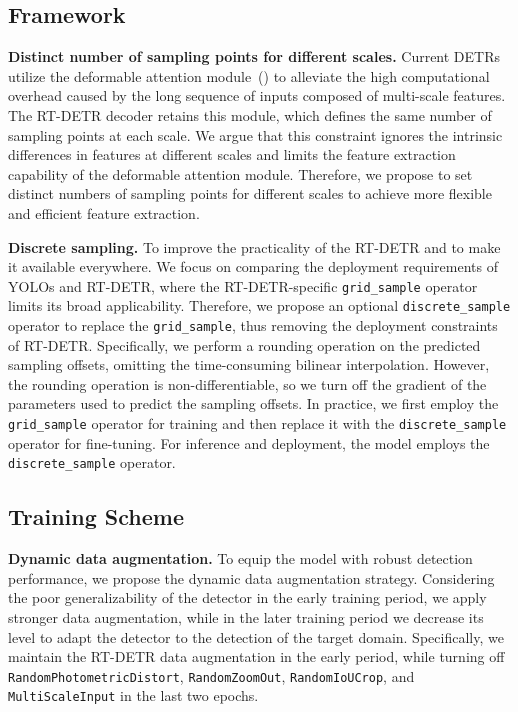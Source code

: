 \documentclass{article}
\begin{document}
\subsection{Framework}
\noindent \textbf{Distinct number of sampling points for different scales.} 
Current DETRs utilize the deformable attention module~(\cite{zhu2020deformable}) to alleviate the high computational overhead caused by the long sequence of inputs composed of multi-scale features.
The RT-DETR decoder retains this module, which defines the same number of sampling points at each scale.
We argue that this constraint ignores the intrinsic differences in features at different scales and limits the feature extraction capability of the deformable attention module.
Therefore, we propose to set distinct numbers of sampling points for different scales to achieve more flexible and efficient feature extraction.

\noindent \textbf{Discrete sampling.}
To improve the practicality of the RT-DETR and to make it available everywhere.
We focus on comparing the deployment requirements of YOLOs and RT-DETR, where the RT-DETR-specific \texttt{grid\_sample} operator limits its broad applicability.
Therefore, we propose an optional \texttt{discrete\_sample} operator to replace the \texttt{grid\_sample}, thus removing the deployment constraints of RT-DETR.
Specifically, we perform a rounding operation on the predicted sampling offsets, omitting the time-consuming bilinear interpolation. 
However, the rounding operation is non-differentiable, so we turn off the gradient of the parameters used to predict the sampling offsets.
In practice, we first employ the \texttt{grid\_sample} operator for training and then replace it with the \texttt{discrete\_sample} operator for fine-tuning.
For inference and deployment, the model employs the \texttt{discrete\_sample} operator.

\subsection{Training Scheme}
\noindent \textbf{Dynamic data augmentation.} 
To equip the model with robust detection performance, we propose the dynamic data augmentation strategy. 
Considering the poor generalizability of the detector in the early training period, we apply stronger data augmentation, while in the later training period we decrease its level to adapt the detector to the detection of the target domain.
Specifically, we maintain the RT-DETR data augmentation in the early period, while turning off \texttt{RandomPhotometricDistort}, \texttt{RandomZoomOut}, \texttt{RandomIoUCrop}, and \texttt{MultiScaleInput} in the last two epochs.
\end{document}
